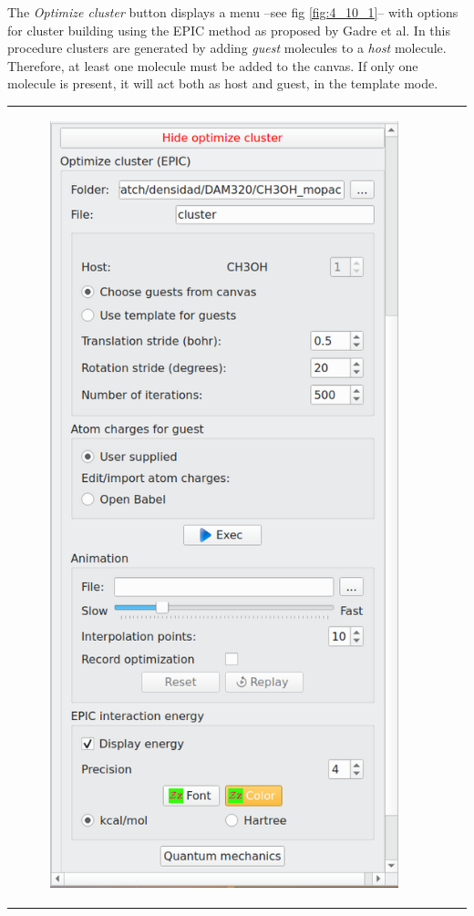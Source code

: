 \documentclass[10pt]{article}
\begin{document}
The {\it Optimize cluster} button displays a menu 
--see fig \ref{fig:4_10_1}-- with options for 
cluster building using the EPIC method as proposed by Gadre et al.\footnotemark
{}
In this procedure clusters are generated by adding {\it guest} molecules to 
a {\it host} molecule. Therefore, at least one molecule must be
added to the canvas. If only one molecule is present, it will act both as host
and guest, in the template mode.

\vspace*{5mm}

\begin{tabular}{lcr}
\begin{minipage}{.3\linewidth}
    \begin{figure}[H]
        \begin{center}
            \includegraphics[width=0.68\linewidth]{damqt320_mespimizer_1.png}

\end{center}
\end{figure}
\end{minipage}
\end{tabular}
\end{document}
